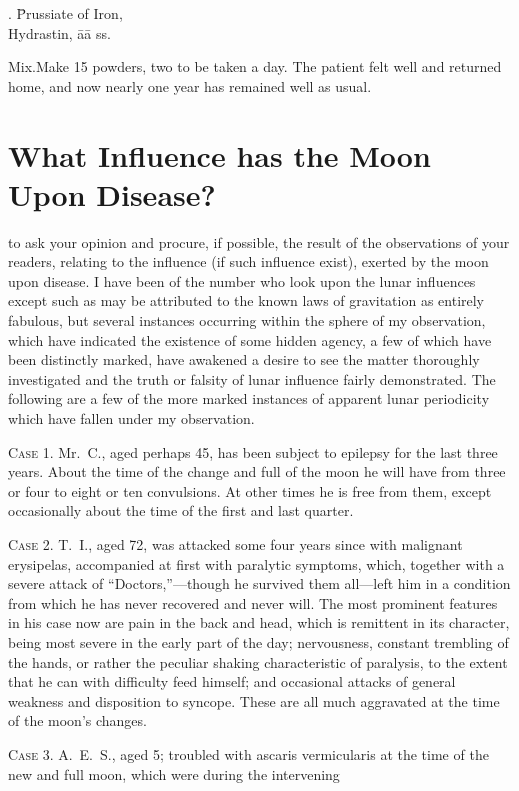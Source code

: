 
\begin{center}
\begin{tabbing}
  \prescription. \= Prussiate of Iron,  \\
    \> Hydrastin, āā \dram{} ss.
\end{tabbing}
\end{center}
Mix.\quad{}Make 15 powders, two to be taken a day. The patient felt
well and returned home, and now nearly one year has remained well as
usual.

\arrowbulletornament
\section*{What Influence has the Moon Upon Disease?}


 to ask your opinion and procure, if possible, the result of the
observations of your readers, relating to the influence (if such influence
exist), exerted by the moon upon disease. I have been of the number
who look upon the lunar influences except such as may be attributed to
the known laws of gravitation as entirely fabulous, but several instances
occurring within the sphere of my observation, which have indicated
the existence of some hidden agency, a few of which have been distinctly
marked, have awakened a desire to see the matter thoroughly
investigated and the truth or falsity of lunar influence fairly demonstrated.
The following are a few of the more marked instances of apparent lunar
periodicity which have fallen under my observation.

\textsc{Case 1.} Mr.~C., aged perhaps 45, has been subject to epilepsy for
the last three years. About the time of the change and full of the
moon he will have from three or four to eight or ten convulsions. At
other times he is free from them, except occasionally about the time of
the first and last quarter.

\textsc{Case 2.} T.~I., aged 72, was attacked some four years since with malignant
erysipelas, accompanied at first with paralytic symptoms,
which, together with a severe attack of ``Doctors,''---though he survived
them all---left him in a condition from which he has never recovered
and never will. The most prominent features in his case now
are pain in the back and head, which is remittent in its character,
being most severe in the early part of the day; nervousness, constant
trembling of the hands, or rather the peculiar shaking characteristic of
paralysis, to the extent that he can with difficulty feed himself; and
occasional attacks of general weakness and disposition to syncope.
These  are all much aggravated at the time of the moon's
changes.

\textsc{Case 3}. A.~E.~S., aged 5; troubled with ascaris vermicularis at
the time of the new and full moon, which were during the intervening\endinput
